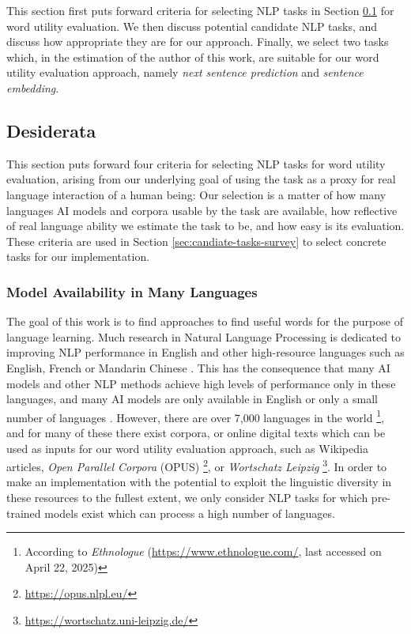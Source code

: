 This section first puts forward criteria for selecting NLP tasks in Section \ref{sec:nlp-tasks-desiderata} for word utility evaluation.
We then discuss potential candidate NLP tasks, and discuss how appropriate they are for our approach.
Finally, we select two tasks which, in the estimation of the author of this work, are suitable for our word utility evaluation approach, namely \textit{next sentence prediction} and \textit{sentence embedding}.

\subsection{Desiderata} \label{sec:nlp-tasks-desiderata}

This section puts forward four criteria for selecting NLP tasks for word utility evaluation, arising from our underlying goal of using the task as a proxy for real language interaction of a human being:
Our selection is a matter of how many languages AI models and corpora usable by the task are available, how reflective of real language ability we estimate the task to be, and how easy is its evaluation.
These criteria are used in Section \ref{sec:candiate-tasks-survey} to select concrete tasks for our implementation.

\subsubsection{Model Availability in Many Languages}
The goal of this work is to find approaches to find useful words for the purpose of language learning.
Much research in Natural Language Processing is dedicated to improving NLP performance in English and other high-resource languages such as English, French or Mandarin Chinese \cite{joshiStateFateLinguistic2021}.
This has the consequence that many AI models and other NLP methods achieve high levels of performance only in these languages, and many AI models are only available in English or only a small number of languages \cite{joshiStateFateLinguistic2021}.
However, there are over 7,000 languages in the world \footnote{According to \textit{Ethnologue} (\url{https://www.ethnologue.com/}, last accessed on April 22, 2025)}, and for many of these there exist corpora, or online digital texts which can be used as inputs for our word utility evaluation approach, such as Wikipedia articles, \textit{Open Parallel Corpora}  (OPUS) \footnote{\url{https://opus.nlpl.eu/}}, or \textit{Wortschatz Leipzig} \footnote{\url{https://wortschatz.uni-leipzig.de/}}.
In order to make an implementation with the potential to exploit the linguistic diversity in these resources to the fullest extent, we only consider NLP tasks for which pre-trained models exist which can process a high number of languages.

